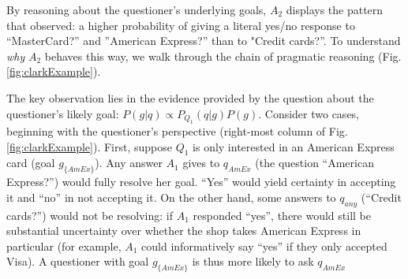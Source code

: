 \documentclass[11pt, floatsintext]{apa6}
\begin{document}
By reasoning about the questioner's underlying goals, $A_2$ displays the pattern that  observed: a higher probability of giving a literal yes/no response to ``MasterCard?'' and ''American Express?'' than to "Credit cards?''. To understand \emph{why} $A_2$ behaves this way, we walk through the chain of pragmatic reasoning (Fig. \ref{fig:clarkExample}).

The key observation lies in the evidence provided by the question about the questioner's likely goal: $P(g | q) \propto P_{Q_1}(q|g)P(g)$. Consider two cases, beginning with the questioner's perspective  (right-most column of Fig. \ref{fig:clarkExample}). First, suppose $Q_1$ is only interested in an American Express card (goal $g_{\{AmEx\}}$). Any answer $A_1$ gives to $q_{AmEx}$ (the question ``American Express?'') would fully resolve her goal. ``Yes'' would yield certainty in accepting it and ``no'' in not accepting it. On the other hand, some answers to $q_{any}$ (``Credit cards?'') would not be resolving: if $A_1$ responded ``yes'', there would still be substantial uncertainty over whether the shop takes American Express in particular (for example, $A_1$ could informatively say ``yes'' if they only accepted Visa). A questioner with goal $g_{\{AmEx\}}$  is thus more likely to ask $q_{AmEx}$



\end{document}

